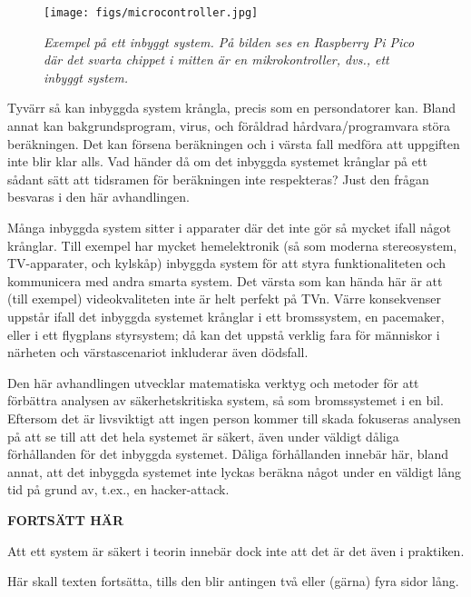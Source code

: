 \documentclass[svenska]{style/LTHthesis}
\begin{document}
\begin{figure}
    \vspace*{-2mm}
    \begin{centering}
        \texttt{[image: figs/microcontroller.jpg]}
    \end{centering}\small\par\medskip
    \noindent\emph{Exempel på ett inbyggt system. På bilden ses en Raspberry Pi Pico där det svarta chippet i mitten är en mikrokontroller, dvs., ett inbyggt system.}\footnotemark
    \vspace*{-2mm}
\end{figure}

Tyvärr så kan inbyggda system krångla, precis som en persondatorer kan.
Bland annat kan bakgrundsprogram, virus, och föråldrad hårdvara/programvara störa beräkningen.
Det kan försena beräkningen och i värsta fall medföra att uppgiften inte blir klar alls.
Vad händer då om det inbyggda systemet krånglar på ett sådant sätt att tidsramen för beräkningen inte respekteras?
Just den frågan besvaras i den här avhandlingen.

Många inbyggda system sitter i apparater där det inte gör så mycket ifall något krånglar.
Till exempel har mycket hemelektronik (så som moderna stereosystem, TV-apparater, och kylskåp) inbyggda system för att styra funktionaliteten och kommunicera med andra smarta system.
Det värsta som kan hända här är att (till exempel) videokvaliteten inte är helt perfekt på TVn.
Värre konsekvenser uppstår ifall det inbyggda systemet krånglar i ett bromssystem, en pacemaker, eller i ett flygplans styrsystem; då kan det uppstå verklig fara för människor i närheten och värstascenariot inkluderar även dödsfall.

Den här avhandlingen utvecklar matematiska verktyg och metoder för att förbättra analysen av säkerhetskritiska system, så som bromssystemet i en bil.
Eftersom det är livsviktigt att ingen person kommer till skada fokuseras analysen på att se till att det hela systemet är säkert, även under väldigt dåliga förhållanden för det inbyggda systemet.
Dåliga förhållanden innebär här, bland annat, att det inbyggda systemet inte lyckas beräkna något under en väldigt lång tid på grund av, t.ex., en hacker-attack.

\textbf{FORTSÄTT HÄR}

Att ett system är säkert i teorin innebär dock inte att det är det även i praktiken.


Här skall texten fortsätta, tills den blir antingen två eller (gärna) fyra sidor lång.
\end{document}
